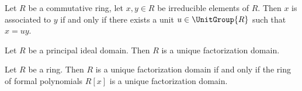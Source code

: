 \begin{proposition}
Let $R$ be a commutative ring, let $x,y\in R$ be irreducible elements of $R$.
Then $x$ is associated to $y$ if and only if there exists a unit
$u\in\UnitGroup{R}$ such that $x=uy$.
\end{proposition}

\begin{proposition}
Let $R$ be a principal ideal domain. Then $R$ is a unique
factorization domain.
\end{proposition}

\begin{theorem}
Let $R$ be a ring. Then $R$ is a unique factorization domain if and
only if the ring of formal polynomials $R[x]$ is a unique
factorization domain.
\end{theorem}